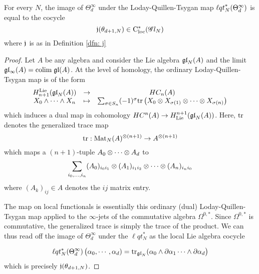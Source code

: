 \begin{lem}
For every $N$, the image of $\Theta_d^\infty$ under the Loday-Quillen-Tsygan map ${\ell q t}_N^*(\Theta_d^\infty)$ is equal to the cocycle
\[
\mathfrak j(\theta_{d+1, N}) \in {\rm C}_{\rm loc}^*(\mathscr G l_N)
\]
where $\mathfrak j$ is as in Definition \ref{dfn: j}
\end{lem}

\begin{proof}
Let $A$ be any algebra and consider the Lie algebra ${\mathfrak{gl}}_N(A)$ and the limit $\mathfrak{g} \mathfrak{l}_\infty(A) = {\rm colim} \; {\mathfrak{gl}} (A)$. 
At the level of homology, the ordinary Loday-Quillen-Tsygan map is of the form
\[
\begin{array}{ccc}
H_{n+1}^{\rm Lie}({\mathfrak{gl}}_N(A)) & \to & HC_{n}(A) \\
X_0 \wedge \cdots \wedge X_n & \mapsto & \sum_{\sigma \in S_n} (-1)^{\sigma} {\rm tr} \left(X_0 \otimes X_{\sigma(1)} \otimes\cdots \otimes X_{\sigma(n)} \right) 
\end{array}
\] 
which induces a dual map in cohomology $HC^n(A) \to H^{n+1}_{\rm Lie}({\mathfrak{gl}}_N(A))$. 
Here, ${\rm tr}$ denotes the generalized trace map
\[
{\rm tr} : {\rm Mat}_N(A)^{\otimes(n+1)} \to A^{\otimes (n+1)} 
\]
which maps a $(n+1)$-tuple $A_0\otimes \cdots \otimes A_d$ to 
\[
\sum_{i_0,\ldots,i_n} (A_0)_{i_0 i_1} \otimes (A_1)_{i_1i_2} \otimes \cdots \otimes (A_n)_{i_n i_0}
\]
where $(A_k)_{ij} \in A$ denotes the $ij$ matrix entry.

The map on local functionals is essentially this ordinary (dual) Loday-Quillen-Tsygan map applied to the $\infty$-jets of the commutative algebra $\Omega^{0,*}$. 
Since $\Omega^{0,*}$ is commutative, the generalized trace is simply the trace of the product.
We can thus read off the image of $\Theta^\infty_d$ under the $\ell q t_N^*$ as the local Lie algebra cocycle

\begin{align*}
\ell q t_N^*(\Theta_d^\infty)\left(\alpha_0, \cdots, \alpha_d) = {\rm tr}_{{\mathfrak{gl}}_N}(\alpha_0 \wedge \partial \alpha_1 \cdots \wedge \partial \alpha_d\right)
\end{align*}
which is precisely $\mathfrak j(\theta_{d+1,N})$. 
\end{proof}

